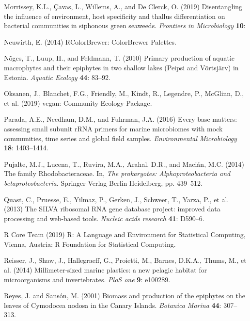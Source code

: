 \documentclass[12pt,]{article}
\begin{document}
\leavevmode\hypertarget{ref-Morrissey2019}{}%
Morrissey, K.L., Çavas, L., Willems, A., and De Clerck, O. (2019)
Disentangling the influence of environment, host specificity and thallus
differentiation on bacterial communities in siphonous green seaweeds.
\emph{Frontiers in Microbiology} \textbf{10}:

\leavevmode\hypertarget{ref-Neuwirth2014}{}%
Neuwirth, E. (2014) RColorBrewer: ColorBrewer Palettes.

\leavevmode\hypertarget{ref-Noges2010}{}%
Nõges, T., Luup, H., and Feldmann, T. (2010) Primary production of
aquatic macrophytes and their epiphytes in two shallow lakes (Peipsi and
Võrtsjärv) in Estonia. \emph{Aquatic Ecology} \textbf{44}: 83--92.

\leavevmode\hypertarget{ref-Oksanen2019}{}%
Oksanen, J., Blanchet, F.G., Friendly, M., Kindt, R., Legendre, P.,
McGlinn, D., et al. (2019) vegan: Community Ecology Package.

\leavevmode\hypertarget{ref-Parada2016}{}%
Parada, A.E., Needham, D.M., and Fuhrman, J.A. (2016) Every base
matters: assessing small subunit rRNA primers for marine microbiomes
with mock communities, time series and global field samples.
\emph{Environmental Microbiology} \textbf{18}: 1403--1414.

\leavevmode\hypertarget{ref-Pujalte2014}{}%
Pujalte, M.J., Lucena, T., Ruvira, M.A., Arahal, D.R., and Macián, M.C.
(2014) The family Rhodobacteraceae. In, \emph{The prokaryotes:
Alphaproteobacteria and betaproteobacteria}. Springer-Verlag Berlin
Heidelberg, pp. 439--512.

\leavevmode\hypertarget{ref-Quast2013}{}%
Quast, C., Pruesse, E., Yilmaz, P., Gerken, J., Schweer, T., Yarza, P.,
et al. (2013) The SILVA ribosomal RNA gene database project: improved
data processing and web-based tools. \emph{Nucleic acids research}
\textbf{41}: D590--6.

\leavevmode\hypertarget{ref-RCoreTeam2019}{}%
R Core Team (2019) R: A Language and Environment for Statistical
Computing, Vienna, Austria: R Foundation for Statistical Computing.

\leavevmode\hypertarget{ref-Reisser2014}{}%
Reisser, J., Shaw, J., Hallegraeff, G., Proietti, M., Barnes, D.K.A.,
Thums, M., et al. (2014) Millimeter-sized marine plastics: a new pelagic
habitat for microorganisms and invertebrates. \emph{PloS one}
\textbf{9}: e100289.

\leavevmode\hypertarget{ref-Reyes2001}{}%
Reyes, J. and Sansón, M. (2001) Biomass and production of the epiphytes
on the leaves of Cymodocea nodosa in the Canary Islands. \emph{Botanica
Marina} \textbf{44}: 307--313.
\end{document}
